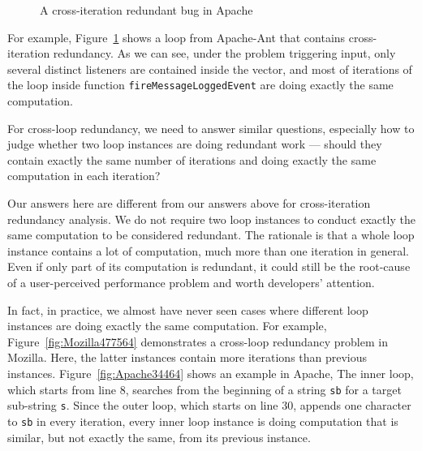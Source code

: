 \begin{figure}
\caption{A cross-iteration redundant bug in Apache}
\label{fig:Apache37184}
\end{figure}



For example, Figure~\ref{fig:Apache37184} shows a loop from Apache-Ant that
contains cross-iteration redundancy.
As we can see, under the problem triggering input, 
only several distinct listeners are contained inside the vector, and most of 
iterations of the loop inside function \texttt{fireMessageLoggedEvent}
are doing exactly the same computation. 





For cross-loop redundancy, we need to answer similar questions,
especially how to judge whether two loop instances are doing redundant work ---
should they contain exactly the same number of iterations and doing exactly
the same computation in each iteration?

Our answers here are different from our answers above for cross-iteration
redundancy analysis.
We do not require two loop instances to
conduct exactly the same computation to be considered redundant. The rationale
is that a whole loop instance contains a lot of computation, much more than
one iteration in general. Even if only part of its computation
is redundant, it could still be the root-cause of a user-perceived performance
problem and worth developers' attention. 

In fact, in practice, we almost have never seen cases where different loop 
instances are doing exactly the same computation.
For example, Figure~\ref{fig:Mozilla477564} demonstrates a cross-loop redundancy
problem in Mozilla. Here, the
latter instances contain more iterations than previous instances. 
Figure~\ref{fig:Apache34464} shows an example in Apache, 
The inner loop, which starts from line 8,  
searches from the beginning of a string \texttt{sb} for a target sub-string 
\texttt{s}. Since the outer loop, which starts on line 30, appends one 
character to \texttt{sb} in every iteration, every inner loop instance is 
doing computation that is similar, but not exactly the same, 
from its previous instance.


